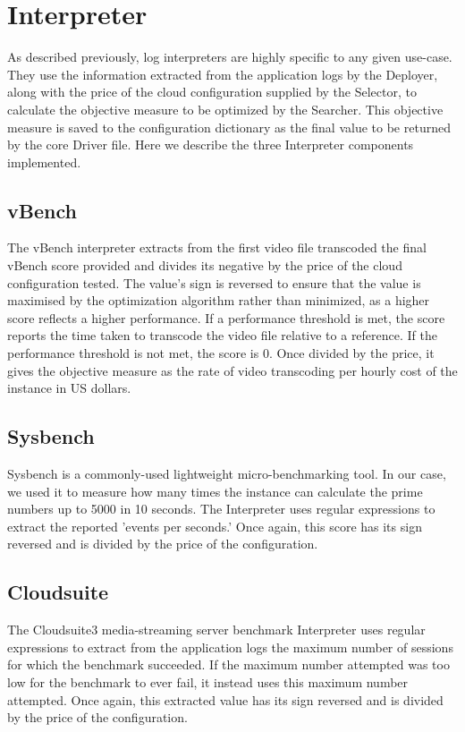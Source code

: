 \documentclass{report}
\begin{document}
\section{Interpreter}
As described previously, log interpreters are highly specific to any given use-case. They use the information extracted from the application logs by the Deployer, along with the price of the cloud configuration supplied by the Selector, to calculate the objective measure to be optimized by the Searcher. This objective measure is saved to the configuration dictionary as the final value to be returned by the core Driver file. Here we describe the three Interpreter components implemented.
\subsection{vBench}
The vBench interpreter extracts from the first video file transcoded the final vBench score provided and divides its negative by the price of the cloud configuration tested. The value's sign is reversed to ensure that the value is maximised by the optimization algorithm rather than minimized, as a higher score reflects a higher performance. If a performance threshold is met, the score reports the time taken to transcode the video file relative to a reference. If the performance threshold is not met, the score is 0. Once divided by the price, it gives the objective measure as the rate of video transcoding per hourly cost of the instance in US dollars. 
\subsection{Sysbench}
Sysbench is a commonly-used lightweight micro-benchmarking tool. In our case, we used it to measure how many times the instance can calculate the prime numbers up to 5000 in 10 seconds. The Interpreter uses regular expressions to extract the reported 'events per seconds.' Once again, this score has its sign reversed and is divided by the price of the configuration.
\subsection{Cloudsuite}
The Cloudsuite3 media-streaming server benchmark Interpreter uses regular expressions to extract from the application logs the maximum number of sessions for which the benchmark succeeded. If the maximum number attempted was too low for the benchmark to ever fail, it instead uses this maximum number attempted. Once again, this extracted value has its sign reversed and is divided by the price of the configuration.
\end{document}
